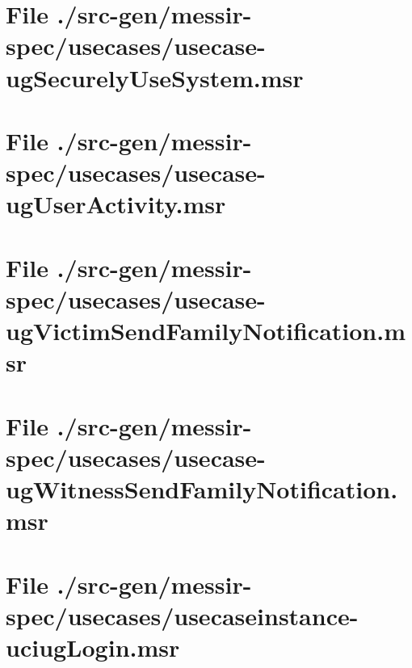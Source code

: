 \section[File /src-gen/messir-spec/usecases/usecase-ugSecurelyUseSystem.msr]{File ./src-gen/messir-spec/usecases/usecase-ugSecurelyUseSystem.msr}
\scriptsize

\normalsize
	
\section[File /src-gen/messir-spec/usecases/usecase-ugUserActivity.msr]{File ./src-gen/messir-spec/usecases/usecase-ugUserActivity.msr}
\scriptsize

\normalsize
	
\section[File /src-gen/messir-spec/usecases/usecase-ugVictimSendFamilyNotification.msr]{File ./src-gen/messir-spec/usecases/usecase-ugVictimSendFamilyNotification.msr}
\scriptsize

\normalsize
	
\section[File /src-gen/messir-spec/usecases/usecase-ugWitnessSendFamilyNotification.msr]{File ./src-gen/messir-spec/usecases/usecase-ugWitnessSendFamilyNotification.msr}
\scriptsize

\normalsize
	
\section[File /src-gen/messir-spec/usecases/usecaseinstance-uciugLogin.msr]{File ./src-gen/messir-spec/usecases/usecaseinstance-uciugLogin.msr}
\scriptsize

\normalsize
	
